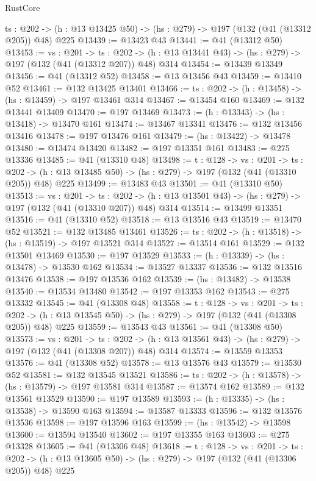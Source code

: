 \begin{lexlean}{RustCore}
\begin{coremodule}
  {ts : @202} -> (h : @13 @13425 @50) -> (hs : @279) -> @197 (@132 (@41 (@13312 @205)) @48) @225
@13439 := @13423 @43
@13441 := @41 (@13312 @50)
@13453 := {vs : @201} ->
  {ts : @202} -> (h : @13 @13441 @43) -> (hs : @279) -> @197 (@132 (@41 (@13312 @207)) @48) @314
@13454 := @13439 @13349
@13456 := @41 (@13312 @52)
@13458 := @13 @13456 @43
@13459 := @13410 @52
@13461 := @132 @13425 @13401
@13466 := {ts : @202} -> (h : @13458) -> (hs : @13459) -> @197 @13461 @314
@13467 := @13454 @160
@13469 := @132 @13441 @13409
@13470 := @197 @13469
@13473 := (h : @13343) -> (hs : @13418) -> @13470 @161
@13474 := @13467 @13341
@13476 := @132 @13456 @13416
@13478 := @197 @13476 @161
@13479 := (hs : @13422) -> @13478
@13480 := @13474 @13420
@13482 := @197 @13351 @161
@13483 := @275 @13336
@13485 := @41 (@13310 @48)
@13498 := {t : @128} ->
  {vs : @201} ->
  {ts : @202} -> (h : @13 @13485 @50) -> (hs : @279) -> @197 (@132 (@41 (@13310 @205)) @48) @225
@13499 := @13483 @43
@13501 := @41 (@13310 @50)
@13513 := {vs : @201} ->
  {ts : @202} -> (h : @13 @13501 @43) -> (hs : @279) -> @197 (@132 (@41 (@13310 @207)) @48) @314
@13514 := @13499 @13351
@13516 := @41 (@13310 @52)
@13518 := @13 @13516 @43
@13519 := @13470 @52
@13521 := @132 @13485 @13461
@13526 := {ts : @202} -> (h : @13518) -> (hs : @13519) -> @197 @13521 @314
@13527 := @13514 @161
@13529 := @132 @13501 @13469
@13530 := @197 @13529
@13533 := (h : @13339) -> (hs : @13478) -> @13530 @162
@13534 := @13527 @13337
@13536 := @132 @13516 @13476
@13538 := @197 @13536 @162
@13539 := (hs : @13482) -> @13538
@13540 := @13534 @13480
@13542 := @197 @13353 @162
@13543 := @275 @13332
@13545 := @41 (@13308 @48)
@13558 := {t : @128} ->
  {vs : @201} ->
  {ts : @202} -> (h : @13 @13545 @50) -> (hs : @279) -> @197 (@132 (@41 (@13308 @205)) @48) @225
@13559 := @13543 @43
@13561 := @41 (@13308 @50)
@13573 := {vs : @201} ->
  {ts : @202} -> (h : @13 @13561 @43) -> (hs : @279) -> @197 (@132 (@41 (@13308 @207)) @48) @314
@13574 := @13559 @13353
@13576 := @41 (@13308 @52)
@13578 := @13 @13576 @43
@13579 := @13530 @52
@13581 := @132 @13545 @13521
@13586 := {ts : @202} -> (h : @13578) -> (hs : @13579) -> @197 @13581 @314
@13587 := @13574 @162
@13589 := @132 @13561 @13529
@13590 := @197 @13589
@13593 := (h : @13335) -> (hs : @13538) -> @13590 @163
@13594 := @13587 @13333
@13596 := @132 @13576 @13536
@13598 := @197 @13596 @163
@13599 := (hs : @13542) -> @13598
@13600 := @13594 @13540
@13602 := @197 @13355 @163
@13603 := @275 @13328
@13605 := @41 (@13306 @48)
@13618 := {t : @128} ->
  {vs : @201} ->
  {ts : @202} -> (h : @13 @13605 @50) -> (hs : @279) -> @197 (@132 (@41 (@13306 @205)) @48) @225

\end{coremodule}
\end{lexlean}
